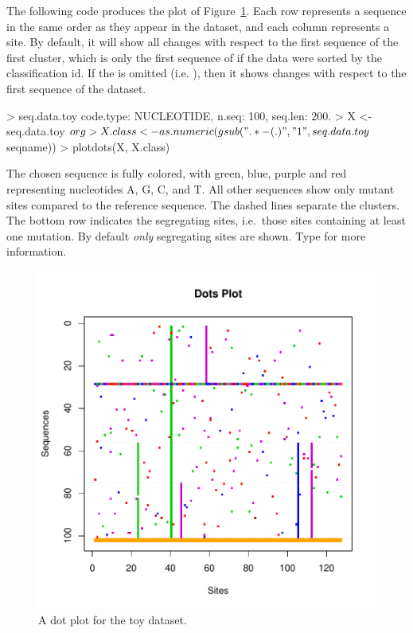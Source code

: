 The following code produces the plot of Figure~\ref{fig:toydots}.
Each row represents a sequence in the same order as they appear in the dataset,
and each column represents a site.
By default, it will show all changes with respect to the first sequence of the first cluster,
which is only the first sequence of  if the data were sorted by the classification id.
If the  is omitted (i.e. ), then it shows changes with respect to the first
sequence of the dataset.
\begin{Code}
> seq.data.toy
code.type: NUCLEOTIDE, n.seq: 100, seq.len: 200.
> X <- seq.data.toy$org
> X.class <- as.numeric(gsub(".*-(.)", "\\1", seq.data.toy$seqname))
> plotdots(X, X.class)
\end{Code}

The chosen sequence is fully colored, with green, blue, purple and red representing 
nucleotides A, G, C, and T.
All other sequences show only mutant sites compared to the reference sequence.
The dashed lines separate the clusters.
The bottom row indicates the segregating sites, i.e.\ those sites containing
at least one mutation.
By default {\it only} segregating sites are shown.
Type  for more information.
\begin{figure}[h]
\begin{center}
\includegraphics[width=5.0in]{./phyclust-include/f-toydots}
\caption{A dot plot for the toy dataset.}
\label{fig:toydots}
\end{center}
\end{figure}


